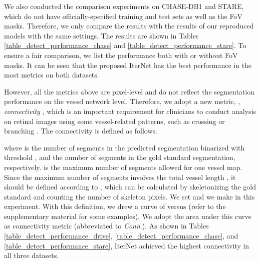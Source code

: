 \documentclass[10pt,twocolumn,letterpaper]{article}
\begin{document}
We also conducted the comparison experiments on CHASE-DB1 and STARE, which do not have officially-specified training and test sets as well as the FoV masks. Therefore, we only compare the results with the results of our reproduced models with the same settings. The results are shown in Tables \ref{table_detect_performance_chase} and \ref{table_detect_performance_stare}. To ensure a fair comparison, we list the performance both with or without FoV masks.
It can be seen that the proposed IterNet has the best performance in the most metrics on both datasets.

However, all the metrics above are pixel-level and do not reflect the segmentation performance on the vessel network level. Therefore, we adopt a new metric, \ie, \textit{connectivity} \cite{MOCCIA201871,6019055}, which is an important requirement for clinicians to conduct analysis on retinal images using some vessel-related patterns, such as crossing or branching \cite{kawasaki}. The connectivity  is defined as follows.

where  is the number of segments in the predicted segmentation binarized with threshold , and  the number of segments in the gold standard segmentation, respectively.  is the maximum number of segments allowed for one vessel map. Since the maximum number of segments involves the total vessel length , it should be defined according to , which can be calculated by skeletonizing the gold standard and counting the number of skeleton pixels. We set  and we make  in this experiment. With this definition, we drew a curve of  versus  (refer to the supplementary material for some examples). We adopt the area under this curve as connectivity metric (abbreviated to \emph{Conn}.).
As shown in Tables \ref{table_detect_performance_drive}, \ref{table_detect_performance_chase}, and \ref{table_detect_performance_stare}, IterNet achieved the highest connectivity in all three datasets.
\end{document}
